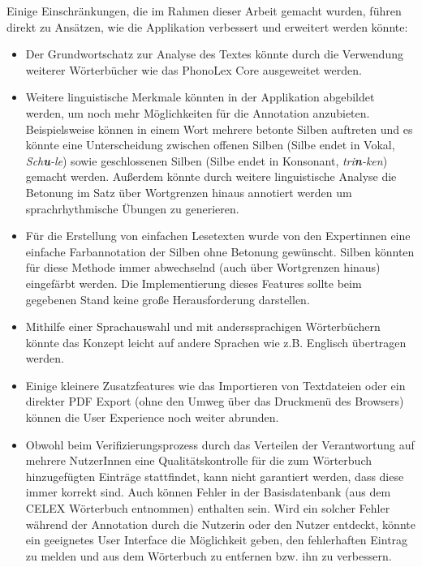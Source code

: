 Einige Einschränkungen, die im Rahmen dieser Arbeit gemacht wurden, führen direkt zu Ansätzen, wie die Applikation verbessert und erweitert werden könnte:

\begin{itemize}
	\item Der Grundwortschatz zur Analyse des Textes könnte durch die Verwendung weiterer Wörterbücher wie das PhonoLex Core ausgeweitet werden.
	
	\item Weitere linguistische Merkmale könnten in der Applikation abgebildet werden, um noch mehr Möglichkeiten für die Annotation anzubieten. Beispielsweise können in einem Wort mehrere betonte Silben auftreten und es könnte eine Unterscheidung zwischen offenen Silben (Silbe endet in Vokal, \textit{Sch\textbf{u}-le}) sowie geschlossenen Silben (Silbe endet in Konsonant, \textit{tri\textbf{n}-ken}) gemacht werden. Außerdem könnte durch weitere linguistische Analyse die Betonung im Satz über Wortgrenzen hinaus annotiert werden um sprachrhythmische Übungen zu generieren.
	
	\item Für die Erstellung von einfachen Lesetexten wurde von den Expertinnen eine einfache Farbannotation der Silben ohne Betonung gewünscht. Silben könnten für diese Methode immer abwechselnd (auch über Wortgrenzen hinaus) eingefärbt werden. Die Implementierung dieses Features sollte beim gegebenen Stand keine große Herausforderung darstellen.
	
	\item Mithilfe einer Sprachauswahl und mit anderssprachigen Wörterbüchern könnte das Konzept leicht auf andere Sprachen wie z.B. Englisch übertragen werden.
	
	\item Einige kleinere Zusatzfeatures wie das Importieren von Textdateien oder ein direkter PDF Export (ohne den Umweg über das Druckmenü des Browsers) können die User Experience noch weiter abrunden.
	
	\item Obwohl beim Verifizierungsprozess durch das Verteilen der Verantwortung auf mehrere NutzerInnen eine Qualitätskontrolle für die zum Wörterbuch hinzugefügten Einträge stattfindet, kann nicht garantiert werden, dass diese immer korrekt sind. Auch können Fehler in der Basisdatenbank (aus dem CELEX Wörterbuch entnommen) enthalten sein. Wird ein solcher Fehler während der Annotation durch die Nutzerin oder den Nutzer entdeckt, könnte ein geeignetes User Interface die Möglichkeit geben, den fehlerhaften Eintrag zu melden und aus dem Wörterbuch zu entfernen bzw. ihn zu verbessern.
\end{itemize}

